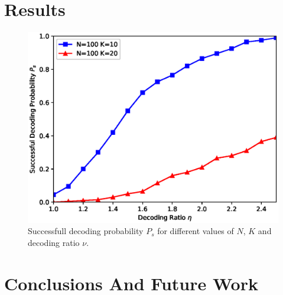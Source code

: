 \documentclass[journal]{IEEEtran}
\begin{document}
\section{Results}
\label{sec:results}
\begin{figure}
  \centering
    \includegraphics[width=0.9\columnwidth]{ratiovsprob.eps}
  \caption{Successfull decoding probability $P_s$ for different values of $N$, $K$ and decoding ratio $\nu$.}
  \label{fig:ratiovsprob}
\end{figure}

\section{Conclusions And Future Work}
\label{sec:conclusions}



\end{document}
